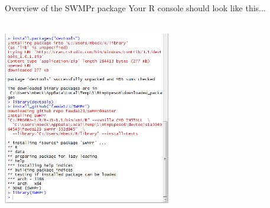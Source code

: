 \documentclass[xcolor=svgnames]{beamer}\usepackage[]{graphicx}\usepackage[]{color}
\begin{document}
\begin{frame}[t, fragile]{Overview of the SWMPr package}
Your R console should look like this...\\~\\
\centerline{\includegraphics[width = 0.55\textwidth]{swmpr_install.png}}
\end{frame}
\end{document}
